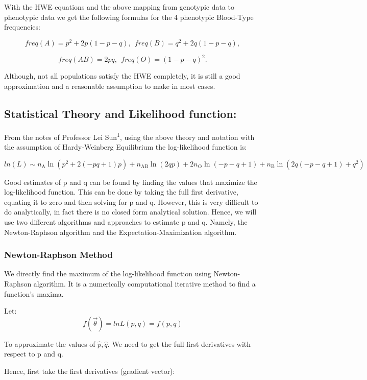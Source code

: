 \documentclass[]{article}
\begin{document}
With the HWE equations and the above mapping from genotypic data to
phenotypic data we get the following formulas for the 4 phenotypic
Blood-Type frequencies:

\[freq(A)=p^2+2p(1-p-q),  \: \:   freq(B)=q^2+2q(1-p-q),\]

\[freq(AB)=2pq,  \: \:   freq(O)=(1-p-q)^2.\]

Although, not all populations satisfy the HWE completely, it is still a
good approximation and a reasonable assumption to make in most cases.

\subsection{Statistical Theory and Likelihood
function:}\label{statistical-theory-and-likelihood-function}

From the notes of Professor Lei Sun\textsuperscript{1}, using the above
theory and notation with the assumption of Hardy-Weinberg Equilibrium
the log-likelihood function is:

\[ln(L) \sim n_\text{A}\ln\left(p^2+2\left(-p q+1\right)p\right)+n_\text{AB}\ln\left(2qp\right)+2n_\text{O}\ln\left(-p-q+1\right)+n_\text{B}\ln\left(2q\left(-p-q+1\right)+q^2\right)
\]

Good estimates of p and q can be found by finding the values that
maximize the log-likelihood function. This can be done by taking the
full first derivative, equating it to zero and then solving for p and q.
However, this is very difficult to do analytically, in fact there is no
closed form analytical solution. Hence, we will use two different
algorithms and approaches to estimate p and q. Namely, the
Newton-Raphson algorithm and the Expectation-Maximization algorithm.

\subsubsection{Newton-Raphson Method}\label{newton-raphson-method}

We directly find the maximum of the log-likelihood function using
Newton-Raphson algorithm. It is a numerically computational iterative
method to find a function's maxima.

Let: \[f(\vec \theta) = lnL(p,q) = f(p,q)\]

To approximate the values of \(\hat{p}, \hat{q}.\) We need to get the
full first derivatives with respect to p and q.

Hence, first take the first derivatives (gradient vector):
\end{document}
